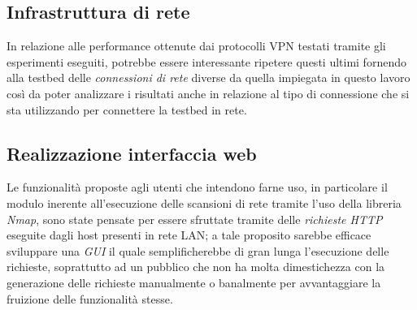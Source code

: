 \subsection{Infrastruttura di rete}
In relazione alle performance ottenute dai protocolli VPN testati tramite gli esperimenti eseguiti, potrebbe essere interessante ripetere questi ultimi fornendo alla testbed delle \emph{connessioni di rete} diverse da quella impiegata in questo lavoro così da poter analizzare i risultati anche in relazione al tipo di connessione che si sta utilizzando per connettere la testbed in rete.

\subsection{Realizzazione interfaccia web}
Le funzionalità proposte agli utenti che intendono farne uso, in particolare il modulo inerente all'esecuzione delle scansioni di rete tramite l'uso della libreria \emph{Nmap}, sono state pensate per essere sfruttate tramite delle \emph{richieste HTTP} eseguite dagli host presenti in rete LAN; a tale proposito sarebbe efficace sviluppare una \emph{GUI} il quale semplificherebbe di gran lunga l'esecuzione delle richieste, soprattutto ad un pubblico che non ha molta dimestichezza con la generazione delle richieste manualmente o banalmente per avvantaggiare la fruizione delle funzionalità stesse.


